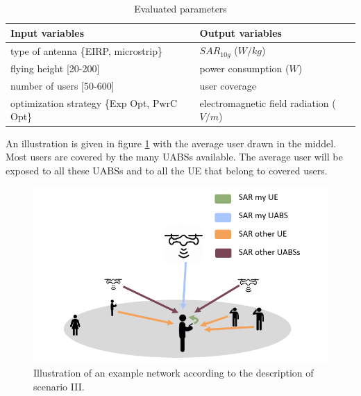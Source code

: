 \begin{table}[!htb]
      \centering
            \begin{tabular}{|l|l|}
            \hline
            \textbf{Input variables  }                        & \textbf{Output variables}       \\   \hline 
            type of antenna  \{EIRP, microstrip\}               & $SAR_{10g}$ ($W/kg$)                    \\ 
            flying height    [20-200]                         & power consumption ($W$)             \\ 
            number of users  [50-600]                         & user coverage                   \\
            optimization strategy \{Exp Opt, PwrC Opt\}         &   electromagnetic field radiation ($V/m$)\\
            \hline
            \end{tabular}
                 \caption{Evaluated parameters}
          \label{table:s3:evalpara}
\end{table}
An illustration is given in figure \ref{fig:IllustrationS3} with the average user drawn in the middel.
Most users are covered by the many \gls{UABS}s available. The average user 
will be exposed to all these \gls{UABS}s and to all the \gls{UE} that belong to covered users.

\begin{figure}[H]
\centering
  \includegraphics[width=\textwidth/10*8]{../images/IllustrationS3.png}
  \caption{Illustration of an example network according to the description of scenario III.}
  \label{fig:IllustrationS3}
\end{figure}

